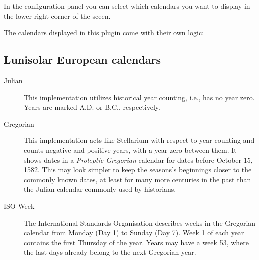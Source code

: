 In the configuration panel you can select which calendars you want to
display in the lower right corner of the sceen.


The calendars displayed in this plugin come with their own logic:

\subsection{Lunisolar European calendars}
\begin{description}
\item[Julian] This implementation utilizes historical year counting,
  i.e., has no year zero. Years are marked A.D. or B.C., respectively.
\item[Gregorian] This implementation acts like Stellarium with respect
  to year counting and counts negative and positive years, with a year
  zero between them. It shows dates in a \emph{Proleptic Gregorian}
  calendar for dates before October 15, 1582. This may look simpler to
  keep the seasons's beginnings closer to the commonly known dates, at
  least for many more centuries in the past than the Julian calendar
  commonly used by historians.
\item[ISO Week] The International Standards Organisation describes
  weeks in the Gregorian calendar from Monday (Day 1) to Sunday (Day
  7). Week 1 of each year contains the first Thursday of the
  year. Years may have a week 53, where the last days already belong
  to the next Gregorian year.
\end{description}

